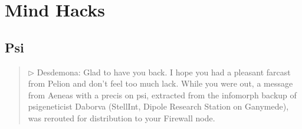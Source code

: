 \chapter{Mind Hacks}
\label{cha:mind-hacks}


\section{Psi}

\begin{quotation}

$\triangleright $ Desdemona: Glad to have you back. I hope
you had a pleasant farcast from Pelion and don’t
feel too much lack. While you were out, a message
from Aeneas with a precis on psi, extracted from
the infomorph backup of psigeneticist Daborva
(StellInt, Dipole Research Station on Ganymede),
was rerouted for distribution to your Firewall node.
\end{quotation}

